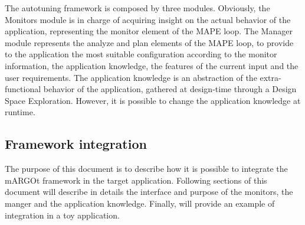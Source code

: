 The autotuning framework is composed by three modules. 
Obviously, the Monitors module is in charge of acquiring insight on the actual behavior of the application, representing the monitor element of the MAPE loop.
The Manager module represents the analyze and plan elements of the MAPE loop, to provide to the application the most suitable configuration according to the monitor information, the application knowledge, the features of the current input and the user requirements.
The application knowledge is an abstraction of the extra-functional behavior of the application, gathered at design-time through a Design Space Exploration.
However, it is possible to change the application knowledge at runtime.


\subsection{Framework integration}

The purpose of this document is to describe how it is possible to integrate the mARGOt framework in the target application.
Following sections of this document will describe in details the interface and purpose of the monitors, the manger and the application knowledge.
Finally,   will provide an example of integration in a toy application.





